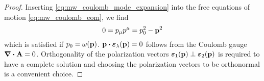 \mwcoulombmodeexpansion
\begin{proof}
	Inserting \cref{eq:mw_coulomb_mode_expansion} into the free equations of motion \cref{eq:mw_coulomb_eom}, we find
	\begin{equation*}
		0
		=
		p_\mu p^\mu
		=
		p_0^2
		-
		\vb{p}^2
	\end{equation*}
	which is satisfied if $p_0=\omega(\vb{p})$.
	$\vb{p}\vdot\boldsymbol{\varepsilon}_\lambda(\vb{p})=0$ follows from the Coulomb gauge $\div\vb{A}=0$.
	Orthogonality of the polarization vectors $\boldsymbol{\varepsilon}_1(\vb{p})\perp\boldsymbol{\varepsilon}_2(\vb{p})$ is required to have a complete solution and choosing the polarization vectors to be orthonormal is a convenient choice.
\end{proof}